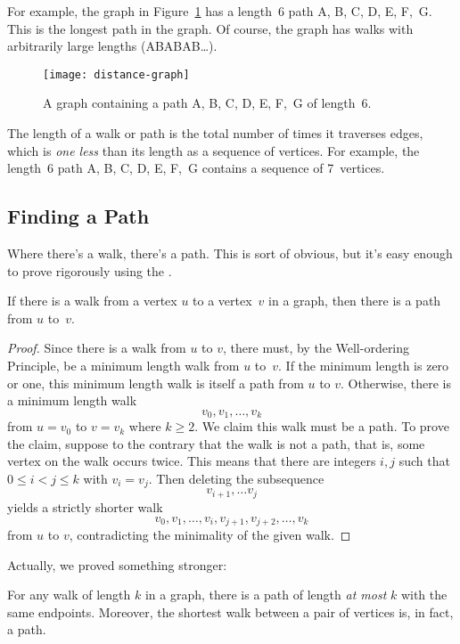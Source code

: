 For example, the graph in Figure~\ref{dg} has a length~6 path A, B, C,
D, E, F,~G.  This is the longest path in the graph.  Of course, the
graph has walks with arbitrarily large lengths (\eg ABABAB\dots).
\begin{figure}[htbp]
\texttt{[image: distance-graph]}
\caption{A graph containing a path A, B, C, D, E, F,~G of length~6.}
\label{dg}
\end{figure}

The length of a walk or path is the total number of times it traverses
edges, which is \emph{one less} than its length as a sequence of
vertices.  For example, the length~6 path A, B, C, D, E, F,~G contains
a sequence of 7~vertices.

\subsection{Finding a Path}

Where there's a walk, there's a path.  This is sort of obvious, but
it's easy enough to prove rigorously using the .

\begin{lemma}\label{simplepath}
If there is a walk from a vertex $u$ to a vertex~$v$ in a graph, then
there is a path from $u$ to~$v$.
\end{lemma}

\begin{proof}
Since there is a walk from $u$ to $v$, there must, by the
Well-ordering Principle, be a minimum length walk from $u$ to~$v$.  If
the minimum length is zero or one, this minimum length walk is itself
a path from $u$ to $v$.  Otherwise, there is a minimum length walk
\[
v_0, v_1, \dots, v_k
\]
from $u = v_0$ to $v = v_k$ where $k \geq 2$.  We claim this walk must
be a path.  To prove the claim, suppose to the contrary that the walk
is not a path, that is, some vertex on the walk occurs twice.  This
means that there are integers $i,j$ such that $0 \leq i < j \leq k$
with $v_i= v_j$.  Then deleting the subsequence
\[
    v_{i+1}, \dots v_j
\]
yields a strictly shorter walk
\[
    v_0, v_1,\dots, v_i,v_{j+1},v_{j+2},\dots, v_k
\]
from $u$ to $v$, contradicting the minimality of the given walk.
\end{proof}

Actually, we proved something stronger:
\begin{corollary}\label{ss}
For any walk of length $k$ in a graph, there is a path of length
\emph{at most} $k$ with the same endpoints.  Moreover, the shortest
walk between a pair of vertices is, in fact, a path.
\end{corollary}


